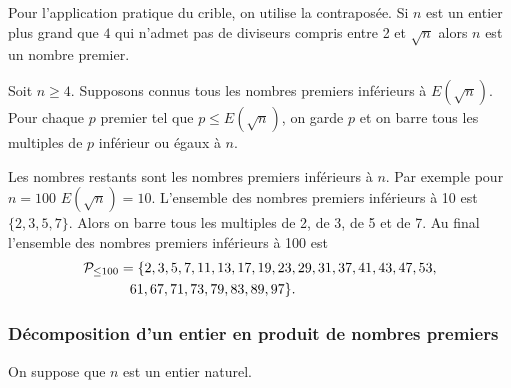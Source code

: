 Pour l'application pratique du crible, on utilise la contraposée. Si $n$ est un entier plus grand que $4$ qui n'admet pas de diviseurs compris entre 2 et $\sqrt{n}$ alors $n$ est un nombre premier.

Soit $n \geq 4$. Supposons connus tous les nombres premiers inférieurs à $E(\sqrt{n})$. Pour chaque $p$ premier tel que $p \leq E(\sqrt{n})$, on garde $p$ et on barre tous les multiples de $p$ inférieur ou égaux à $n$.

Les nombres restants sont les nombres premiers inférieurs à $n$. Par exemple pour $n=100$ $E(\sqrt{n})=10$. L'ensemble des nombres premiers inférieurs à 10 est $\{2,3,5,7\}$. Alors on barre tous les multiples de 2, de 3, de 5 et de 7. Au final l'ensemble des nombres premiers inférieurs à 100 est 
\begin{align}
\P_{\leq 100}&=\{2,3,5,7,11,13,17,19,23,29,31,37,41,43,47,53, \notag \\
& \phantom{=} 61,67,71,73,79,83,89,97\}.
\end{align}

\subsubsection{Décomposition d'un entier en produit de nombres premiers}

On suppose que $n$ est un entier naturel.

